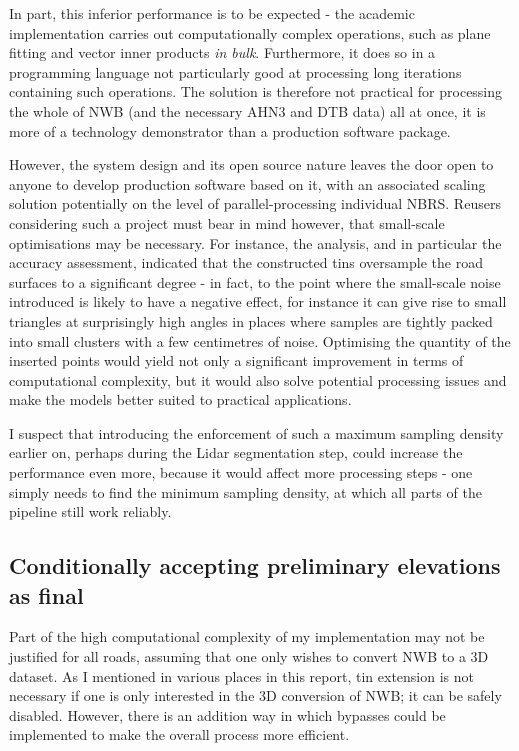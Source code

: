 In part, this inferior performance is to be expected - the academic implementation carries out computationally complex operations, such as plane fitting and vector inner products \textit{in bulk}. Furthermore, it does so in a programming language not particularly good at processing long iterations containing such operations. The solution is therefore not practical for processing the whole of NWB (and the necessary AHN3 and DTB data) all at once, it is more of a technology demonstrator than a production software package.

However, the system design and its open source nature leaves the door open to anyone to develop production software based on it, with an associated scaling solution potentially on the level of parallel-processing individual NBRS. Reusers considering such a project must bear in mind however, that small-scale optimisations may be necessary. For instance, the analysis, and in particular the accuracy assessment, indicated that the constructed \ac{tin}s oversample the road surfaces to a significant degree - in fact, to the point where the small-scale noise introduced is likely to have a negative effect, for instance it can give rise to small triangles at surprisingly high angles in places where samples are tightly packed into small clusters with a few centimetres of noise. Optimising the quantity of the inserted points would yield not only a significant improvement in terms of computational complexity, but it would also solve potential processing issues and make the models better suited to practical applications.

I suspect that introducing the enforcement of such a maximum sampling density earlier on, perhaps during the Lidar segmentation step, could increase the performance even more, because it would affect more processing steps - one simply needs to find the minimum sampling density, at which all parts of the pipeline still work reliably.

\subsection{Conditionally accepting preliminary elevations as final}
\label{sub:preliminaryelevationsasfinal}

Part of the high computational complexity of my implementation may not be justified for all roads, assuming that one only wishes to convert NWB to a 3D dataset. As I mentioned in various places in this report, \ac{tin} extension is not necessary if one is only interested in the 3D conversion of NWB; it can be safely disabled. However, there is an addition way in which bypasses could be implemented to make the overall process more efficient.

